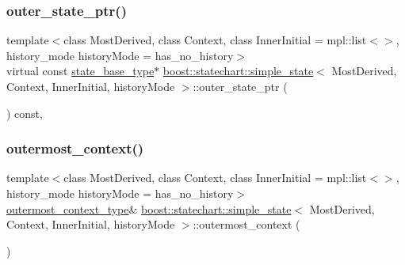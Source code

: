 \subsubsection{\texorpdfstring{outer\+\_\+state\+\_\+ptr()}{outer\_state\_ptr()}}
{\footnotesize\ttfamily template$<$class Most\+Derived, class Context, class Inner\+Initial = mpl\+::list$<$$>$, history\+\_\+mode history\+Mode = has\+\_\+no\+\_\+history$>$ \\
virtual const \mbox{\hyperlink{classboost_1_1statechart_1_1simple__state_ae4af81f8eae996cc418efa3387af0ef6}{state\+\_\+base\+\_\+type}}$\ast$ \mbox{\hyperlink{classboost_1_1statechart_1_1simple__state}{boost\+::statechart\+::simple\+\_\+state}}$<$ Most\+Derived, Context, Inner\+Initial, history\+Mode $>$\+::outer\+\_\+state\+\_\+ptr (\begin{DoxyParamCaption}{ }\end{DoxyParamCaption}) const\hspace{0.3cm}{\ttfamily [inline]}, {\ttfamily [virtual]}}

\mbox{\label{classboost_1_1statechart_1_1simple__state_a5a2e9abf29040c3dd91ac9d98a17f564}} 
\subsubsection{\texorpdfstring{outermost\+\_\+context()}{outermost\_context()}\hspace{0.1cm}{\footnotesize\ttfamily [1/2]}}
{\footnotesize\ttfamily template$<$class Most\+Derived, class Context, class Inner\+Initial = mpl\+::list$<$$>$, history\+\_\+mode history\+Mode = has\+\_\+no\+\_\+history$>$ \\
\mbox{\hyperlink{classboost_1_1statechart_1_1simple__state_a25f32527ab9e99c9ae75c723e4be9cb6}{outermost\+\_\+context\+\_\+type}}\& \mbox{\hyperlink{classboost_1_1statechart_1_1simple__state}{boost\+::statechart\+::simple\+\_\+state}}$<$ Most\+Derived, Context, Inner\+Initial, history\+Mode $>$\+::outermost\+\_\+context (\begin{DoxyParamCaption}{ }\end{DoxyParamCaption})\hspace{0.3cm}{\ttfamily [inline]}}


